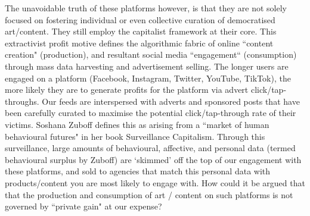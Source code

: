 The unavoidable truth of these platforms however, is that they are not solely focused on fostering individual or even collective curation of democratised art/content. They still employ the capitalist framework at their core. This extractivist profit motive defines the algorithmic fabric of online ``content creation" (production), and resultant social media ``engagement`` (consumption) through mass data harvesting and advertisement selling. The longer users are engaged on a platform (Facebook, Instagram, Twitter, YouTube, TikTok), the more likely they are to generate profits for the platform via advert click/tap-throughs. Our feeds are interspersed with adverts and sponsored posts that have been carefully curated to maximise the potential click/tap-through rate of their victims. Soshana Zuboff defines this as arising from a ``market of human behavioural futures" \citep{zuboff2019} in her book Surveillance Capitalism. Through this surveillance, large amounts of behavioural, affective, and personal data (termed behavioural surplus by Zuboff) are `skimmed' off the top of our engagement with these platforms, and sold to agencies that match this personal data with products/content you are most likely to engage with. How could it be argued that that the production and consumption of art / content on such platforms is not governed by ``private gain" at our expense? 


